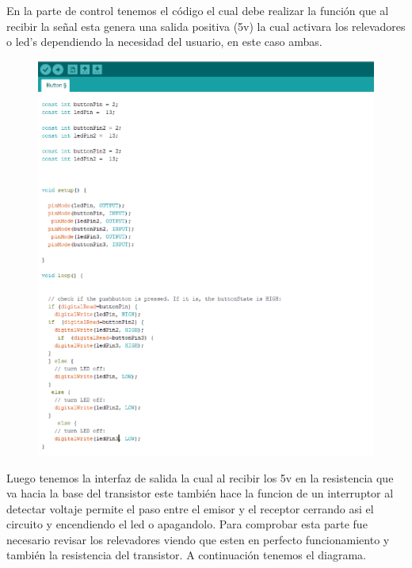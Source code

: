 \documentclass[10pt,a4paper]{article}
\begin{document}
En la parte de control tenemos el código el cual debe realizar  la función que al recibir la señal esta genera una salida positiva (5v) la cual activara los relevadores o led's dependiendo la necesidad del usuario, en este caso ambas.\\
\begin{figure}[hbtp]
\centering
\includegraphics[scale=0.40]{codigo.png} 
\end{figure}

Luego tenemos la interfaz de salida la cual al recibir los 5v en la resistencia que va hacia la base del transistor este también hace la funcion de un interruptor al detectar voltaje permite el paso entre el emisor y el receptor cerrando asi el circuito y encendiendo el led o apagandolo. Para comprobar esta parte fue necesario revisar los relevadores viendo que esten en perfecto funcionamiento y también la resistencia del transistor. A continuación tenemos el diagrama.
\end{document}
